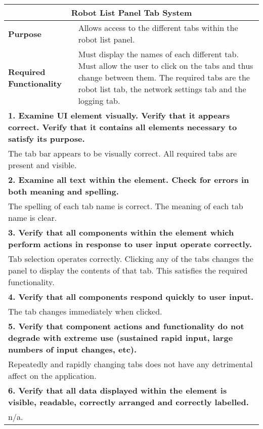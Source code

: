 \begin{longtable}{ l p{10cm} }
\hline
 \multicolumn{2}{c}{\textbf{Robot List Panel Tab System}}\\
 \hline
 \textbf{Purpose} & Allows access to the different tabs within the robot list panel.\\
 \textbf{Required Functionality} & Must display the names of each different tab. Must allow the user to click on the tabs and thus change between them. The required tabs are the robot list tab, the network settings tab and the logging tab.\\
 \hline
 \multicolumn{2}{p{14cm}}{\textbf{1. Examine UI element visually. Verify that it appears correct. Verify that it contains all elements necessary to satisfy its purpose.}}\\
 \multicolumn{2}{p{14cm}}{The tab bar appears to be visually correct. All required tabs are present and visible.}\\
 \hline
 \multicolumn{2}{p{14cm}}{\textbf{2. Examine all text within the element. Check for errors in both meaning and spelling.}}\\
 \multicolumn{2}{p{14cm}}{The spelling of each tab name is correct. The meaning of each tab name is clear.}\\
 \hline
 \multicolumn{2}{p{14cm}}{\textbf{3. Verify that all components within the element which perform actions in response to user input operate correctly.}}\\
 \multicolumn{2}{p{14cm}}{Tab selection operates correctly. Clicking any of the tabs changes the panel to display the contents of that tab. This satisfies the required functionality.}\\
 \hline
 \multicolumn{2}{p{14cm}}{\textbf{4. Verify that all components respond quickly to user input.}}\\
 \multicolumn{2}{p{14cm}}{The tab changes immediately when clicked.}\\
 \hline
 \multicolumn{2}{p{14cm}}{\textbf{5. Verify that component actions and functionality do not degrade with extreme use (sustained rapid input, large numbers of input changes, etc).}}\\
 \multicolumn{2}{p{14cm}}{Repeatedly and rapidly changing tabs does not have any detrimental affect on the application.}\\
 \hline
 \multicolumn{2}{p{14cm}}{\textbf{6. Verify that all data displayed within the element is visible, readable, correctly arranged and correctly labelled.}}\\
 \multicolumn{2}{p{14cm}}{n/a.}\\

\end{longtable}
